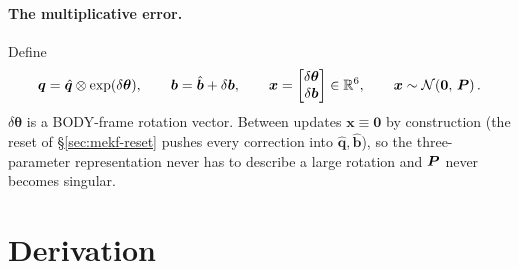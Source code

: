 \paragraph{The multiplicative error.} Define
\begin{equation}
\bm{q} = \hat{\bm{q}}\otimes\exp(\delta\bm{\theta}),\qquad
\bm{b} = \hat{\bm{b}} + \delta\bm{b},\qquad
\bm{x} = \begin{bmatrix}\delta\bm{\theta}\\ \delta\bm{b}\end{bmatrix}\in\mathbb{R}^6,\qquad
\bm{x}\sim\mathcal{N}\!\left(\bm{0},\,\bm{P}\right) .
\label{eq:mekf-err}
\end{equation}
$\delta\bm{\theta}$ is a BODY-frame rotation vector. Between updates $\bm{x}\equiv\bm{0}$ by
construction (the reset of \S\ref{sec:mekf-reset} pushes every correction into
$\hat{\bm{q}},\hat{\bm{b}}$), so the three-parameter representation never has to describe a large
rotation and $\bm{P}$ never becomes singular.

\section{Derivation}

